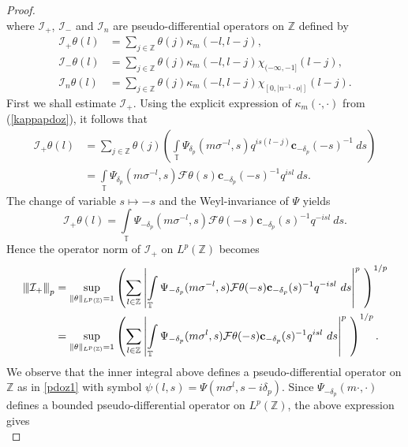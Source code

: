 \documentclass[12pt,reqno]{amsart}
\newcommand{\vertiii}[1]{{\left\vert\kern-0.25ex\left\vert\kern-0.25ex\left\vert #1 
		\right\vert\kern-0.25ex\right\vert\kern-0.25ex\right\vert}}
\newcommand{\Z}{\mathbb Z}%
\theoremstyle{definition}
\theoremstyle{definition}
\numberwithin{equation}{section}
\begin{document}
\begin{proof}
\begin{equation}
\end{equation} 
where $\mathcal{I}_+$, $\mathcal{I}_-$ and $\mathcal{I}_n$ are pseudo-differential operators on $\Z$ defined by
\begin{align*}
\mathcal{I}_+ \theta(l)&=\sum\limits_{j\in\mathbb{Z}}\theta(j)\kappa_{m}(-l,l-j),\\
\mathcal{I}_-\theta(l)&= \sum\limits_{j\in\mathbb{Z}}\theta(j)\kappa_{m}(-l,l-j)\chi_{(-\infty,-1]}(l-j),\\
\mathcal{I}_n\theta(l)&= \sum\limits_{j\in\mathbb{Z}}\theta(j)\kappa_{m}(-l,l-j)\chi_{[0,|n^{-1}\cdot o|]}(l-j).
\end{align*}
First we shall estimate $\mathcal{I}_+$. Using the explicit expression of $\kappa_{m}(\cdot,\cdot)$ from (\ref{kappapdoz}), it follows that
	\begin{align*}
		\mathcal{I}_+\theta(l)&=\sum\limits_{j\in\mathbb{Z}}\theta(j)\left(\int\limits_{\mathbb{T}}\Psi_{\delta_{p}}(m\sigma^{-l},s)q^{is(l-j)}\mathbf{c}_{-\delta_{p}}(-s)^{-1}~ds\right)\\
		&=\int\limits_{\mathbb{T}}\Psi_{\delta_{p}}(m\sigma^{-l},s)\mathcal{F}\theta(s)\mathbf{c}_{-\delta_{p}}(-s)^{-1}q^{isl}~ds.
	\end{align*}
	The change of variable $s\mapsto -s$ and the Weyl-invariance of $\Psi$ yields
	$$\mathcal{I}_+\theta(l)=\int\limits_{\mathbb{T}}\Psi_{-\delta_{p}}(m\sigma^{-l},s)\mathcal{F}\theta(-s)\mathbf{c}_{-\delta_{p}}(s)^{-1}q^{-isl}~ds.$$
	Hence the operator norm of $\mathcal{I}_+$ on $L^{p}(\mathbb{Z})$ becomes
	\begin{align*}
		\vertiii{\mathcal{I}_+}_{p}&=\sup\limits_{\|\theta\|_{L^{p}(\mathbb{Z})}=1}\left(\sum\limits_{l\in\mathbb{Z}}\left|\int\limits_{\mathbb{T}}\Psi_{-\delta_{p}}(m\sigma^{-l},s)\mathcal{F}\theta(-s)\mathbf{c}_{-\delta_{p}}(s)^{-1}q^{-isl}~ds\right|^{p}~\right)^{1/p}\\
		&=\sup\limits_{\|\theta\|_{L^{p}(\mathbb{Z})}=1}\left(\sum\limits_{l\in\mathbb{Z}}\left|\int\limits_{\mathbb{T}}\Psi_{-\delta_{p}}(m\sigma^{l},s)\mathcal{F}\theta(-s)\mathbf{c}_{-\delta_{p}}(s)^{-1}q^{isl}~ds\right|^{p}~\right)^{1/p}.
	\end{align*}
We observe that the inner integral above defines a pseudo-differential operator on $\mathbb{Z}$ as in \eqref{pdoz1} with symbol $\psi(l,s)=\Psi(m\sigma^{l},s-i\delta_{p})$. Since $\Psi_{-\delta_{p}}(m\cdot,\cdot)$ defines a bounded pseudo-differential operator on $L^{p}(\mathbb{Z})$, the above expression gives
	\begin{equation}\label{t3final}

\end{equation}
\end{proof}
\end{document}

